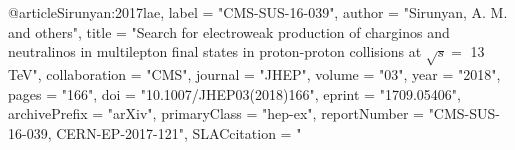 @article{Sirunyan:2017lae,
      label          = "CMS-SUS-16-039",
      author         = "Sirunyan, A. M. and others",
      title          = "{Search for electroweak production of charginos and
                        neutralinos in multilepton final states in proton-proton
                        collisions at $\sqrt{s}=$ 13 TeV}",
      collaboration  = "CMS",
      journal        = "JHEP",
      volume         = "03",
      year           = "2018",
      pages          = "166",
      doi            = "10.1007/JHEP03(2018)166",
      eprint         = "1709.05406",
      archivePrefix  = "arXiv",
      primaryClass   = "hep-ex",
      reportNumber   = "CMS-SUS-16-039, CERN-EP-2017-121",
      SLACcitation   = "%
}


